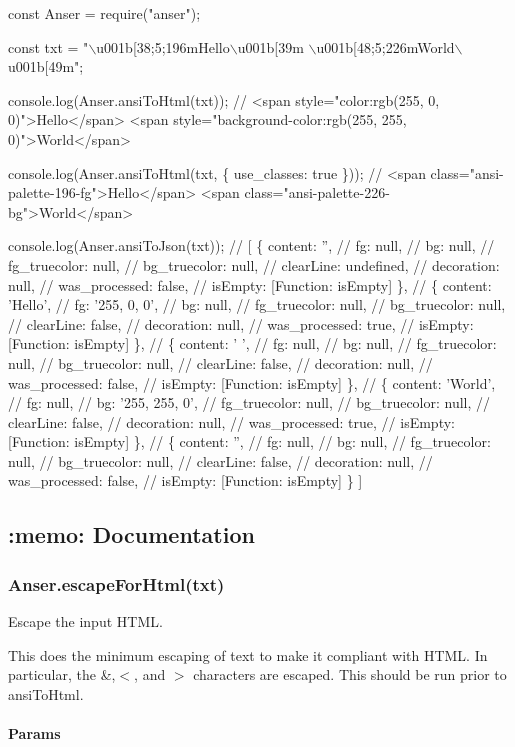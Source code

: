\begin{DoxyCode}
const Anser = require("anser");

const txt = "\(\backslash\)u001b[38;5;196mHello\(\backslash\)u001b[39m \(\backslash\)u001b[48;5;226mWorld\(\backslash\)u001b[49m";

console.log(Anser.ansiToHtml(txt));
// <span style="color:rgb(255, 0, 0)">Hello</span> <span style="background-color:rgb(255, 255,
       0)">World</span>

console.log(Anser.ansiToHtml(txt, \{ use\_classes: true \}));
// <span class="ansi-palette-196-fg">Hello</span> <span class="ansi-palette-226-bg">World</span>

console.log(Anser.ansiToJson(txt));
// [ \{ content: '',
//     fg: null,
//     bg: null,
//     fg\_truecolor: null,
//     bg\_truecolor: null,
//     clearLine: undefined,
//     decoration: null,
//     was\_processed: false,
//     isEmpty: [Function: isEmpty] \},
//   \{ content: 'Hello',
//     fg: '255, 0, 0',
//     bg: null,
//     fg\_truecolor: null,
//     bg\_truecolor: null,
//     clearLine: false,
//     decoration: null,
//     was\_processed: true,
//     isEmpty: [Function: isEmpty] \},
//   \{ content: ' ',
//     fg: null,
//     bg: null,
//     fg\_truecolor: null,
//     bg\_truecolor: null,
//     clearLine: false,
//     decoration: null,
//     was\_processed: false,
//     isEmpty: [Function: isEmpty] \},
//   \{ content: 'World',
//     fg: null,
//     bg: '255, 255, 0',
//     fg\_truecolor: null,
//     bg\_truecolor: null,
//     clearLine: false,
//     decoration: null,
//     was\_processed: true,
//     isEmpty: [Function: isEmpty] \},
//   \{ content: '',
//     fg: null,
//     bg: null,
//     fg\_truecolor: null,
//     bg\_truecolor: null,
//     clearLine: false,
//     decoration: null,
//     was\_processed: false,
//     isEmpty: [Function: isEmpty] \} ]
\end{DoxyCode}


\subsection*{\+:memo\+: Documentation}

\subsubsection*{{\ttfamily Anser.\+escape\+For\+Html(txt)}}

Escape the input H\+T\+ML.

This does the minimum escaping of text to make it compliant with H\+T\+ML. In particular, the \textquotesingle{}\&\textquotesingle{},\textquotesingle{}$<$\textquotesingle{}, and \textquotesingle{}$>$\textquotesingle{} characters are escaped. This should be run prior to {\ttfamily ansi\+To\+Html}. \paragraph*{Params}


